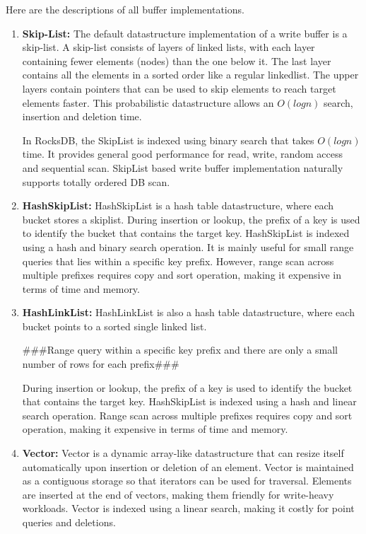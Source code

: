 Here are the descriptions of all buffer implementations.

\begin{enumerate}
    \item \textbf{Skip-List:} The default datastructure implementation of a 
    write buffer is a skip-list.  A skip-list consists of layers of linked 
    lists, with each layer containing fewer elements (nodes) than the one below it. 
    The last layer contains all the elements in a sorted order like a regular linkedlist.
    The upper layers contain pointers that can be used to skip elements to reach target elements faster. 
    This probabilistic datastructure allows an $O(logn)$ search, insertion and deletion time.   
    
    In RocksDB, the SkipList is indexed using binary search that takes $O(logn)$ time.
    It provides general good performance for read, write, random access and sequential scan.
    SkipList based write buffer implementation naturally supports totally ordered DB scan.

    \item \textbf{HashSkipList:} HashSkipList is a hash table datastructure, where each
     bucket stores a skiplist. During insertion or lookup, the prefix of a key is used to
     identify the bucket that contains the target key. HashSkipList is indexed using a hash and 
     binary search operation. It is mainly useful for small range queries that lies within 
     a specific key prefix. However, range scan across multiple prefixes requires copy and 
     sort operation, making it expensive in terms of time and memory.

    \item \textbf{HashLinkList:} HashLinkList is also a hash table datastructure, where each
    bucket points to a sorted single linked list. 

    ###Range query within a specific key prefix and there are only a small number of rows 
    for each prefix###

    During insertion or lookup, the prefix of a key is used to identify the bucket that contains
    the target key. HashSkipList is indexed using a hash and linear search operation. Range scan 
    across multiple prefixes requires copy and sort operation, making it expensive in terms of time and memory.

    \item \textbf{Vector:} Vector is a dynamic array-like datastructure that can resize itself automatically
    upon insertion or deletion of an element. Vector is maintained as a contiguous storage so that iterators 
    can be used for traversal. Elements are inserted at the end of vectors, making them friendly for 
    write-heavy workloads. Vector is indexed using a linear search, making it costly for point queries and deletions.
\end{enumerate}